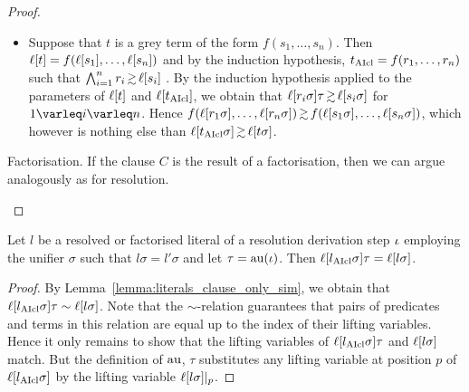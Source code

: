 \documentclass[,%
	draft=false,%
	numbers=noendperiod
	11pt,
	a4paper,
	oneside,%
	openany,
]{memoir}
\begin{document}
{\begin{proof}
\begin{description}
\begin{itemize}
					\item
						Suppose that $t$ is a grey term of the form $f(s_1, \dots, s_n)$.
						Then $\ell[t] = f(\ell[s_1], \dots, \ell[s_n])$ and by the induction hypothesis, $t_{\operatorname{AIcl}} = f(r_1, \dots, r_n)$ such that
						$\bigwedge_{i=1}^n r_i \simgeq \lifboth{s_i}$ .
						By the induction hypothesis applied to the parameters of $\ell[t]$ and $\ell[t_{\operatorname{AIcl}}]$, we obtain that  $\lifboth{r_i\sigma}\tau \simgeq \lifboth{s_i\sigma}$ for $1\nolinebreak \varleq\nolinebreak i\nolinebreak \varleq\nolinebreak n$.
						Hence $  f(\lifboth{r_1\sigma}, \dots, \lifboth{r_n\sigma}) \simgeq f(\lifboth{s_1\sigma}, \dots, \lifboth{s_n\sigma})$,
						which however is nothing else than
						$\lifboth{t\cl\sigma} \simgeq \lifboth{t\sigma} $.

				\end{itemize}

			\item{Factorisation.}
				If the clause $C$ is the result of a factorisation, then we can argue analogously as for resolution.
				\qedhere
		\end{description}

	\end{proof}

}

\begin{lemma}
	\label{lemma:resolved_literal_like_lifted_literal}
	Let $l$ be a resolved or factorised literal of a resolution derivation step $\iota$ employing the unifier $\sigma$ such that $l\sigma = l'\sigma$ and let $\tau =\nolinebreak \aiu(\inference)$.
	Then $\ell[l_{\operatorname{AIcl}}\sigma]\tau = \ell[l\sigma]$.
\end{lemma}
\begin{proof}
	By Lemma~\ref{lemma:literals_clause_only_sim}, we obtain that
	$\ell[l_{\operatorname{AIcl}}\sigma]\tau \sim \ell[l\sigma]$.
	Note that the $\sim$-\nolinebreak{}relation guarantees that pairs of predicates and terms in this relation are equal up to the index of their lifting variables.
	Hence it only remains to show that the lifting variables of $\ell[l_{\operatorname{AIcl}}\sigma]\tau$ and $\ell[l\sigma]$ match.
	But the definition of $\operatorname{au}$, $\tau$ substitutes any lifting variable at position $p$ of $\ell[l_{\operatorname{AIcl}}\sigma]$ by the lifting variable $\ell[l\sigma]|_{p}$.
\end{proof}
\end{document}

